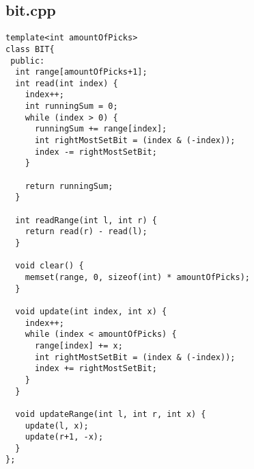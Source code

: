 \documentclass[11pt,landscape,twocolumn]{article}
\begin{document}
\subsection*{bit.cpp}
\begin{lstlisting}
template<int amountOfPicks>
class BIT{
 public:
  int range[amountOfPicks+1];
  int read(int index) {
    index++;
    int runningSum = 0;
    while (index > 0) {
      runningSum += range[index];
      int rightMostSetBit = (index & (-index));
      index -= rightMostSetBit;
    }
 
    return runningSum;
  }

  int readRange(int l, int r) {
    return read(r) - read(l);
  }

  void clear() {
    memset(range, 0, sizeof(int) * amountOfPicks);
  }
 
  void update(int index, int x) {
    index++;
    while (index < amountOfPicks) {
      range[index] += x;
      int rightMostSetBit = (index & (-index));
      index += rightMostSetBit;
    }
  }
 
  void updateRange(int l, int r, int x) {
    update(l, x);
    update(r+1, -x);
  }
};

\end{lstlisting}
\end{document}
